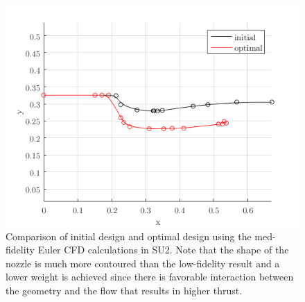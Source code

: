\documentclass{article}
\begin{document}
\begin{figure}
\caption{Comparison of initial design and optimal design using the med-fidelity Euler CFD calculations in SU2. Note that the shape of the nozzle is much more contoured than the low-fidelity result and a lower weight is achieved since there is favorable interaction between the geometry and the flow that results in higher thrust.}
\label{fig:minWeightMedfiSimpleResults}
\begin{center}
\includegraphics[scale=0.5]{figs/det_medfi_result.png}
\end{center}
\end{figure}
\end{document}
